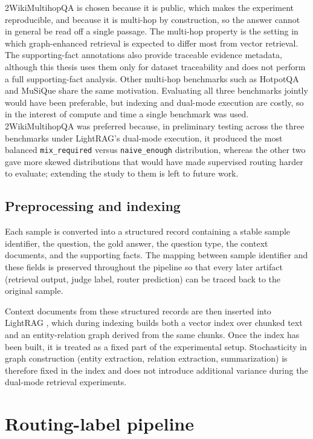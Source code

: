 \documentclass[english, bibtex]{kththesis}               %
\numberwithin{listing}{chapter}
\begin{document}
2WikiMultihopQA is chosen because it is public, which makes the experiment reproducible, and because it is multi-hop by construction, so the answer cannot in general be read off a single passage. The multi-hop property is the setting in which graph-enhanced retrieval is expected to differ most from vector retrieval. The supporting-fact annotations also provide traceable evidence metadata, although this thesis uses them only for dataset traceability and does not perform a full supporting-fact analysis. Other multi-hop benchmarks such as HotpotQA and MuSiQue \cite{yang2018hotpotqa,trivedi2022musique} share the same motivation. Evaluating all three benchmarks jointly would have been preferable, but indexing and dual-mode execution are costly, so in the interest of compute and time a single benchmark was used. 2WikiMultihopQA was preferred because, in preliminary testing across the three benchmarks under LightRAG's dual-mode execution, it produced the most balanced \texttt{mix\_required} versus \texttt{naive\_enough} distribution, whereas the other two gave more skewed distributions that would have made supervised routing harder to evaluate; extending the study to them is left to future work.

\subsection{Preprocessing and indexing}
\label{sec:methodPreprocessing}

Each sample is converted into a structured record containing a stable sample identifier, the question, the gold answer, the question type, the context documents, and the supporting facts. The mapping between sample identifier and these fields is preserved throughout the pipeline so that every later artifact (retrieval output, judge label, router prediction) can be traced back to the original sample.

Context documents from these structured records are then inserted into LightRAG \cite{lightrag2024}, which during indexing builds both a vector index over chunked text and an entity-relation graph derived from the same chunks. Once the index has been built, it is treated as a fixed part of the experimental setup. Stochasticity in graph construction (entity extraction, relation extraction, summarization) is therefore fixed in the index and does not introduce additional variance during the dual-mode retrieval experiments.

\section{Routing-label pipeline}
\label{sec:methodPipeline}
\end{document}
